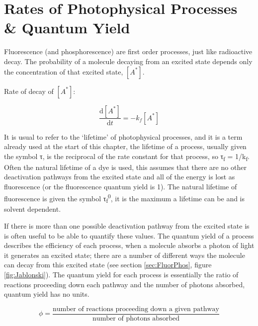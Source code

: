 \documentclass[
]{book}
\begin{document}
\hypertarget{sec:ratesphoto}{%
\section{Rates of Photophysical Processes \& Quantum Yield}\label{sec:ratesphoto}}

Fluorescence (and phosphorescence) are first order processes, just like radioactive decay. The probability of a molecule decaying from an excited state depends only the concentration of that excited state, \([A^\ast]\).

Rate of decay of \([A^\ast]\):

\begin{equation}
\frac{\textrm{d}[A^\ast]}{\textrm{d}t}=-k_f [A^\ast]
\label{eq:fluordecay}
\end{equation}

It is usual to refer to the `lifetime' of photophysical processes, and it is a term already used at the start of this chapter, the lifetime of a process, usually given the symbol τ, is the reciprocal of the rate constant for that process, so τ\textsubscript{f} = 1/k\textsubscript{f}. Often the natural lifetime of a dye is used, this assumes that there are no other deactivation pathways from the excited state and all of the energy is lost as fluorescence (or the fluorescence quantum yield is 1). The natural lifetime of fluorescence is given the symbol τ\textsubscript{f}\textsuperscript{0}, it is the maximum a lifetime can be and is solvent dependent.

If there is more than one possible deactivation pathway from the excited state is is often useful to be able to quantify these values. The quantum yield of a process describes the efficiency of each process, when a molecule absorbs a photon of light it generates an excited state; there are a number of different ways the molecule can decay from this excited state (see section \ref{sec:FluorPhos}, figure \ref{fig:Jablonski}). The quantum yield for each process is essentially the ratio of reactions proceeding down each pathway and the number of photons absorbed, quantum yield has no units.

\begin{equation}
\phi = \frac{\textrm{number of reactions proceeding down a given pathway}}{\textrm{number of photons absorbed}}
\label{eq:QYdef}
\end{equation}
\end{document}
